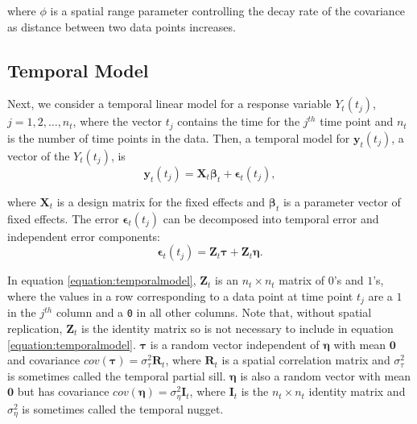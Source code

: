 \documentclass[]{interact}
\theoremstyle{plain}%
\theoremstyle{definition}
\theoremstyle{remark}
\begin{document}
\noindent where \(\phi\) is a spatial range parameter controlling the
decay rate of the covariance as distance between two data points
increases.

\subsection{Temporal Model} \label{subsection:temporalmodel}

Next, we consider a temporal linear model for a response variable
\(Y_t(t_j)\), \(j = 1, 2, \ldots, n_{t}\), where the vector \(t_j\)
contains the time for the \(j^{th}\) time point and \(n_t\) is the
number of time points in the data. Then, a temporal model for
\(\mathbf{y}_t(t_j)\), a vector of the \(Y_t(t_j)\), is \mbox{}
\begin{equation}
\mathbf{y}_t(t_j) = \mathbf{X}_t \bm{\beta}_t + \bm{\epsilon}_t(t_j),
\end{equation}

\noindent where \(\mathbf{X}_t\) is a design matrix for the fixed
effects and \(\bm{\beta}_t\) is a parameter vector of fixed effects. The
error \(\bm{\epsilon}_t(t_j)\) can be decomposed into temporal error and
independent error components: \mbox{} \begin{equation}
\label{equation:temporalmodel}
\bm{\epsilon}_t(t_j) = \mathbf{Z}_{t} \bm{\tau} + \mathbf{Z}_{t} \bm{\eta}.
\end{equation}

\noindent In equation \ref{equation:temporalmodel}, \(\mathbf{Z}_{t}\)
is an \(n_t \times n_t\) matrix of \(0\)'s and \(1\)'s, where the values
in a row corresponding to a data point at time point \(t_j\) are a \(1\)
in the \(j^{th}\) column and a \texttt{0} in all other columns. Note
that, without spatial replication, \(\mathbf{Z}_t\) is the identity
matrix so is not necessary to include in equation
\ref{equation:temporalmodel}. \(\bm{\tau}\) is a random vector
independent of \(\bm{\eta}\) with mean \(\mathbf{0}\) and covariance
\(cov(\bm{\tau}) = \sigma^2_{\tau} \mathbf{R}_{t}\), where
\(\mathbf{R}_t\) is a spatial correlation matrix and \(\sigma^2_{\tau}\)
is sometimes called the temporal partial sill. \(\bm{\eta}\) is also a
random vector with mean \(\mathbf{0}\) but has covariance
\(cov(\bm{\eta}) = \sigma^2_{\eta} \mathbf{I}_{t}\), where
\(\mathbf{I}_t\) is the \(n_t \times n_t\) identity matrix and
\(\sigma^2_{\eta}\) is sometimes called the temporal nugget.
\end{document}
